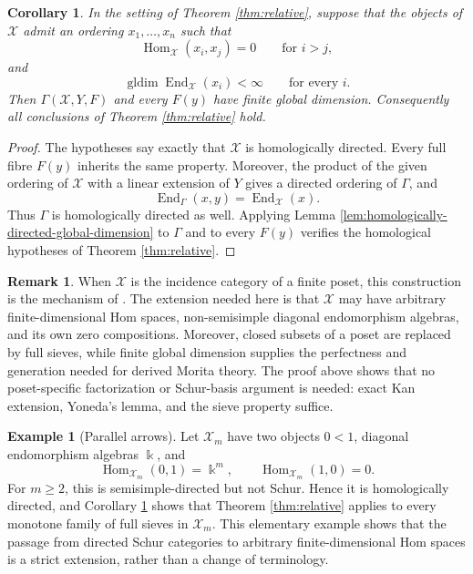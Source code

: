 \documentclass[12pt,a4paper,english,reqno]{amsart}
\theoremstyle{plain}
\newtheorem{corollary}[theorem]{Corollary}
\theoremstyle{definition}
\newtheorem{exm}[theorem]{Example}
\newtheorem{remark}[theorem]{Remark}
\newcommand{\kk}{\Bbbk}
\newcommand{\Hom}{\operatorname{Hom}}
\newcommand{\End}{\operatorname{End}}
\newcommand{\gldim}{\operatorname{gldim}}
\newcommand{\X}{\mathcal X}
\newcommand{\G}{\Gamma}
\begin{document}
\begin{corollary}
\label{cor:directed-relative}
In the setting of Theorem \ref{thm:relative}, suppose that the objects of $\X$
admit an ordering $x_1,\ldots,x_n$ such that
\[
 \Hom_{\X}(x_i,x_j)=0\qquad\text{for }i>j,
\]
and
\[
 \gldim\End_{\X}(x_i)<\infty\qquad\text{for every }i.
\]
Then $\G(\X,Y,F)$ and every $F(y)$ have finite global dimension.
Consequently all conclusions of Theorem \ref{thm:relative} hold.
\end{corollary}

\begin{proof}
The hypotheses say exactly that $\X$ is homologically directed.  Every full
fibre $F(y)$ inherits the same property.  Moreover, the product of the
given ordering of $\X$ with a linear extension of $Y$ gives a directed
ordering of $\G$, and
\[
 \End_{\G}(x,y)=\End_{\X}(x).
\]
Thus $\G$ is homologically directed as well.  Applying
Lemma \ref{lem:homologically-directed-global-dimension} to $\G$ and to every
$F(y)$ verifies the homological hypotheses of Theorem \ref{thm:relative}.
\end{proof}

\begin{remark}
When $\X$ is the incidence category of a finite poset, this construction is
the mechanism of \cite[Theorem~3.1]{CLR}.  The extension needed here is that
$\X$ may have arbitrary finite-dimensional Hom spaces, non-semisimple
diagonal endomorphism algebras, and its own zero compositions.  Moreover,
closed subsets of a poset are replaced by full sieves, while finite global
dimension supplies the perfectness and generation needed for derived
Morita theory.  The proof above shows that no poset-specific factorization
or Schur-basis argument is needed: exact Kan extension, Yoneda's lemma, and
the sieve property suffice.
\end{remark}

\begin{exm}[Parallel arrows]
Let $\X_m$ have two objects $0<1$, diagonal endomorphism algebras
$\kk$, and
\[
 \Hom_{\X_m}(0,1)=\kk^m,
 \qquad
 \Hom_{\X_m}(1,0)=0.
\]
For $m\geq2$, this is semisimple-directed but not Schur.  Hence
it is homologically directed, and Corollary \ref{cor:directed-relative}
shows that Theorem \ref{thm:relative} applies to every monotone family of full sieves in
$\X_m$.  This elementary example shows that the passage from directed
Schur categories to arbitrary finite-dimensional Hom spaces is a strict
extension, rather than a change of terminology.
\end{exm}
\end{document}
